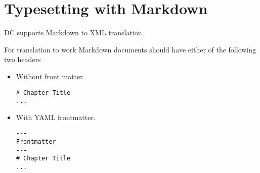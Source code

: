 





 


\section{Typesetting with Markdown}

DC supports Markdown to XML translation.  

\begin{gram}[Header]
For translation to work Markdown documents should have either of the following two headers
\begin{itemize}
\item Without front matter
\begin{lstlisting}
# Chapter Title
...
\end{lstlisting}  

\item  With YAML frontmatter.
\begin{lstlisting}
--- 
Frontmatter
---
# Chapter Title
...
\end{lstlisting}  
\end{itemize}
\end{gram}

